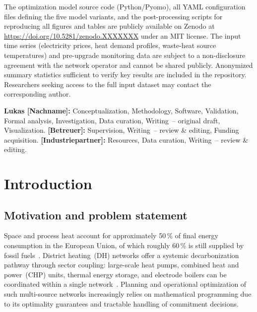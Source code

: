\documentclass[review,3p]{elsarticle}
\begin{document}
\begin{frontmatter}
\begin{dataavailability}
The optimization model source code (Python/Pyomo), all YAML
configuration files defining the five model variants, and the
post-processing scripts for reproducing all figures and tables are
publicly available on Zenodo at
\url{https://doi.org/10.5281/zenodo.XXXXXXX} under an MIT license.
The input time series (electricity prices, heat demand profiles,
waste-heat source temperatures) and pre-upgrade monitoring data are
subject to a non-disclosure agreement with the network operator and
cannot be shared publicly. Anonymized summary statistics sufficient
to verify key results are included in the repository. Researchers
seeking access to the full input dataset may contact the
corresponding author.
\end{dataavailability}

\begin{credit}
\textbf{Lukas [Nachname]:} Conceptualization, Methodology, Software,
Validation, Formal analysis, Investigation, Data curation,
Writing~-- original draft, Visualization.
\textbf{[Betreuer]:} Supervision, Writing~-- review \& editing,
Funding acquisition.
\textbf{[Industriepartner]:} Resources, Data curation,
Writing~-- review \& editing.
\end{credit}

\end{frontmatter}

\linenumbers

\section{Introduction}
\label{sec:introduction}

\subsection{Motivation and problem statement}
\label{sec:motivation}

Space and process heat account for approximately 50\,\% of final
energy consumption in the European Union, of which roughly 60\,\% is
still supplied by fossil fuels~\cite{EUheating2016}. District
heating~(DH) networks offer a systemic decarbonization pathway
through sector coupling: large-scale heat pumps, combined heat and
power~(CHP) units, thermal energy storage, and electrode boilers can
be coordinated within a single network~\cite{Lund2014_4GDH,Werner2017}.
Planning and operational optimization of such multi-source networks
increasingly relies on mathematical programming due to its optimality
guarantees and tractable handling of commitment decisions.
\end{document}
